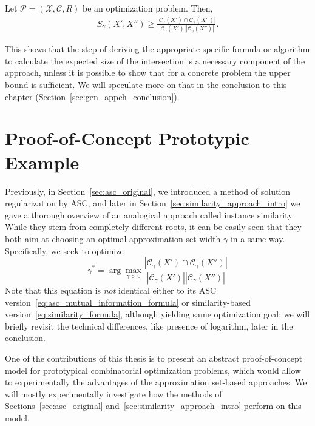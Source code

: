 \begin{theorem} 
  \label{thm:worst_case}
  Let $\mathcal{P} = (\mathcal{X}, \mathcal{C}, R)$ be an optimization problem.
  Then,
  \begin{align}
    S_\gamma(X',X'')\geq\frac{|{\mathcal{C}_\gamma}(X')\cap {\mathcal{C}_\gamma}(X'')|}{|{\mathcal{C}_\gamma}(X')||{\mathcal{C}_\gamma}(X'')|}.
  \end{align}
\end{theorem}
%

\myremark This shows that the step of deriving the appropriate specific formula or
algorithm to calculate the expected size of the intersection is a necessary
component of the approach, unless it is possible to show that for a concrete
problem the upper bound is sufficient. We will speculate more on that in the
conclusion to this chapter (Section~\ref{sec:gen_appch_conclusion}).

\section{Proof-of-Concept Prototypic Example}
\label{sec:proof_of_concept}

Previously, in Section~\ref{sec:asc_original}, we introduced a method of
solution regularization by ASC, and later in
Section~\ref{sec:similarity_approach_intro} we gave a thorough overview of an
analogical approach called instance similarity. While they stem from completely
different roots, it can be easily seen that they both aim at choosing an optimal
approximation set width $\gamma$ in a same way. Specifically, we seek to
optimize
\begin{equation}\label{eq:similarity_maximization_objective}
    \gamma^* = \arg \max_{\gamma >0} \frac{|{\mathcal{C}_\gamma}(X') \cap {\mathcal{C}_\gamma}(X'')|}
      {|{\mathcal{C}_\gamma}(X')||{\mathcal{C}_\gamma}(X'')|}
\end{equation}
\myremark Note that this equation is
\textit{not} identical either to its ASC
version~\eqref{eq:asc_mutual_information_formula} or similarity-based
version~\eqref{eq:similarity_formula}, although yielding same optimization goal;
we will briefly revisit the technical differences, like presence of logarithm,
later in the conclusion.

One of the contributions of this thesis is to present an abstract
proof-of-concept model for prototypical combinatorial optimization problems,
which would allow to experimentally the advantages of the approximation set-based 
approaches. We will mostly experimentally investigate how the methods of
Sections~\ref{sec:asc_original} and~\ref{sec:similarity_approach_intro} perform
on this model.

